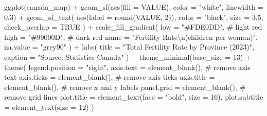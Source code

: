 \documentclass[
  letterpaper,
  DIV=11,
  numbers=noendperiod]{scrartcl}
\newenvironment{Shaded}{\begin{snugshade}}{\end{snugshade}}
\newcommand{\AttributeTok}[1]{\textcolor[rgb]{0.40,0.45,0.13}{#1}}
\newcommand{\CommentTok}[1]{\textcolor[rgb]{0.37,0.37,0.37}{#1}}
\newcommand{\ConstantTok}[1]{\textcolor[rgb]{0.56,0.35,0.01}{#1}}
\newcommand{\DecValTok}[1]{\textcolor[rgb]{0.68,0.00,0.00}{#1}}
\newcommand{\FloatTok}[1]{\textcolor[rgb]{0.68,0.00,0.00}{#1}}
\newcommand{\FunctionTok}[1]{\textcolor[rgb]{0.28,0.35,0.67}{#1}}
\newcommand{\NormalTok}[1]{\textcolor[rgb]{0.00,0.23,0.31}{#1}}
\newcommand{\SpecialCharTok}[1]{\textcolor[rgb]{0.37,0.37,0.37}{#1}}
\newcommand{\StringTok}[1]{\textcolor[rgb]{0.13,0.47,0.30}{#1}}
\begin{document}
\begin{Shaded}
\begin{Highlighting}[]
\FunctionTok{ggplot}\NormalTok{(canada\_map) }\SpecialCharTok{+}
  \FunctionTok{geom\_sf}\NormalTok{(}\FunctionTok{aes}\NormalTok{(}\AttributeTok{fill =}\NormalTok{ VALUE), }\AttributeTok{color =} \StringTok{"white"}\NormalTok{, }\AttributeTok{linewidth =} \FloatTok{0.3}\NormalTok{) }\SpecialCharTok{+}
  \FunctionTok{geom\_sf\_text}\NormalTok{(}
    \FunctionTok{aes}\NormalTok{(}\AttributeTok{label =} \FunctionTok{round}\NormalTok{(VALUE, }\DecValTok{2}\NormalTok{)),}
    \AttributeTok{color =} \StringTok{"black"}\NormalTok{,}
    \AttributeTok{size =} \FloatTok{3.5}\NormalTok{,}
    \AttributeTok{check\_overlap =} \ConstantTok{TRUE}
\NormalTok{  ) }\SpecialCharTok{+}
  \FunctionTok{scale\_fill\_gradient}\NormalTok{(}
    \AttributeTok{low =} \StringTok{"\#FDE0DD"}\NormalTok{,   }\CommentTok{\# light red}
    \AttributeTok{high =} \StringTok{"\#99000D"}\NormalTok{,  }\CommentTok{\# dark red}
    \AttributeTok{name =} \StringTok{"Fertility Rate}\SpecialCharTok{\textbackslash{}n}\StringTok{(children per woman)"}\NormalTok{,}
    \AttributeTok{na.value =} \StringTok{"grey90"}
\NormalTok{  ) }\SpecialCharTok{+}
  \FunctionTok{labs}\NormalTok{(}
    \AttributeTok{title =} \StringTok{"Total Fertility Rate by Province (2023)"}\NormalTok{,}
    \AttributeTok{caption =} \StringTok{"Source: Statistics Canada"}
\NormalTok{  ) }\SpecialCharTok{+}
  \FunctionTok{theme\_minimal}\NormalTok{(}\AttributeTok{base\_size =} \DecValTok{13}\NormalTok{) }\SpecialCharTok{+}
  \FunctionTok{theme}\NormalTok{(}
    \AttributeTok{legend.position =} \StringTok{"right"}\NormalTok{,}
    \AttributeTok{axis.text =} \FunctionTok{element\_blank}\NormalTok{(),       }\CommentTok{\# remove axis text}
    \AttributeTok{axis.ticks =} \FunctionTok{element\_blank}\NormalTok{(),      }\CommentTok{\# remove axis ticks}
    \AttributeTok{axis.title =} \FunctionTok{element\_blank}\NormalTok{(),      }\CommentTok{\# remove x and y labels}
    \AttributeTok{panel.grid =} \FunctionTok{element\_blank}\NormalTok{(),      }\CommentTok{\# remove grid lines}
    \AttributeTok{plot.title =} \FunctionTok{element\_text}\NormalTok{(}\AttributeTok{face =} \StringTok{"bold"}\NormalTok{, }\AttributeTok{size =} \DecValTok{16}\NormalTok{),}
    \AttributeTok{plot.subtitle =} \FunctionTok{element\_text}\NormalTok{(}\AttributeTok{size =} \DecValTok{12}\NormalTok{)}
\NormalTok{  )}
\end{Highlighting}
\end{Shaded}
\end{document}
